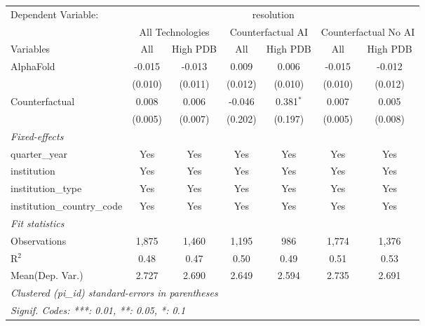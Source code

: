 \begingroup
\centering
\begin{tabular}{lcccccc}
   \tabularnewline \midrule \midrule
   Dependent Variable: & \multicolumn{6}{c}{resolution}\\
 & \multicolumn{2}{c}{All Technologies} & \multicolumn{2}{c}{Counterfactual AI} & \multicolumn{2}{c}{Counterfactual No AI} \\
\cmidrule(lr){1-1}\cmidrule(lr){2-3} \cmidrule(lr){4-5} \cmidrule(lr){6-7}
Variables & \multicolumn{1}{c}{All} & \multicolumn{1}{c}{High PDB} & \multicolumn{1}{c}{All} & \multicolumn{1}{c}{High PDB} & \multicolumn{1}{c}{All} & \multicolumn{1}{c}{High PDB} \\
\cmidrule(lr){1-1}\cmidrule(lr){2-2} \cmidrule(lr){3-3} \cmidrule(lr){4-4} \cmidrule(lr){5-5} \cmidrule(lr){6-6} \cmidrule(lr){7-7}
   AlphaFold                    & -0.015  & -0.013  & 0.009   & 0.006       & -0.015  & -0.012\\   
                                & (0.010) & (0.011) & (0.012) & (0.010)     & (0.010) & (0.012)\\   
   Counterfactual               & 0.008   & 0.006   & -0.046  & 0.381$^{*}$ & 0.007   & 0.005\\   
                                & (0.005) & (0.007) & (0.202) & (0.197)     & (0.005) & (0.008)\\   
   \midrule
   \emph{Fixed-effects}\\
   quarter\_year                & Yes     & Yes     & Yes     & Yes         & Yes     & Yes\\  
   institution                  & Yes     & Yes     & Yes     & Yes         & Yes     & Yes\\  
   institution\_type            & Yes     & Yes     & Yes     & Yes         & Yes     & Yes\\  
   institution\_country\_code   & Yes     & Yes     & Yes     & Yes         & Yes     & Yes\\  
   \midrule
   \emph{Fit statistics}\\
   Observations                 & 1,875   & 1,460   & 1,195   & 986         & 1,774   & 1,376\\  
   R$^2$                        & 0.48    & 0.47    & 0.50    & 0.49        & 0.51    & 0.53\\  
Mean(Dep. Var.) & 2.727 & 2.690 & 2.649 & 2.594 & 2.735 & 2.691 \\
   \midrule \midrule
   \multicolumn{7}{l}{\emph{Clustered (pi\_id) standard-errors in parentheses}}\\
   \multicolumn{7}{l}{\emph{Signif. Codes: ***: 0.01, **: 0.05, *: 0.1}}\\
\end{tabular}
\par\endgroup

